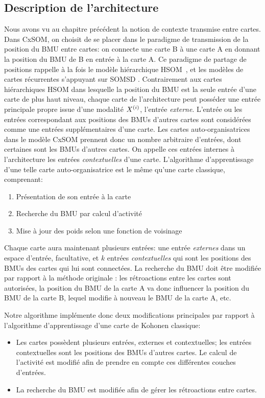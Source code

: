 \subsection{Description de l'architecture}

Nous avons vu au chapitre précédent la notion de contexte transmise entre cartes. Dans CxSOM, on choisit de se placer dans le paradigme de transmission de la position du BMU entre cartes: on connecte une carte B à une carte A en donnant la position du BMU de B en entrée à la carte A. 
Ce paradigme de partage de positions rappelle à la fois le modèle hiérarchique HSOM~\cite{lampinen_clustering_1992}, et les modèles de cartes récurrentes s'appuyant sur SOMSD \cite{hammer_recursive_2004,hagenbuchner_self-organizing_2003,fix20}.
Contrairement aux cartes hiérarchiques HSOM dans lesquelle la position du BMU est la seule entrée d'une carte de plus haut niveau, chaque carte de l'architecture peut posséder une entrée principale propre issue d'une modalité $X^{({i})}$, l'entrée \emph{externe}. L'entrée ou les entrées correspondant aux positions des BMUs d'autres cartes sont considérées comme une entrées supplémentaires d'une carte. Les cartes auto-organisatrices dans le modèle CxSOM prennent donc un nombre arbitraire d'entrées, dont certaines sont les BMUs d'autres cartes. On appelle ces entrées internes à l'architecture les entrées \emph{contextuelles} d'une carte.
L'algorithme d'apprentissage d'une telle carte auto-organisatrice est le même qu'une carte classique, comprenant:
\begin{enumerate}
\item\label{etape:entree} Présentation de son entrée à la carte 
\item\label{etape:bmu} Recherche du BMU par calcul d'activité
\item\label{etape:maj} Mise à jour des poids selon une fonction de voisinage
\end{enumerate}

Chaque carte aura maintenant plusieurs entrées: une entrée \emph{externes} dans un espace d'entrée, facultative, et $k$ entrées \emph{contextuelles} qui sont les positions des BMUs des cartes qui lui sont connectées. 
La recherche du BMU doit être modifiée par rapport à la méthode originale : les rétroactions entre les cartes sont autorisées, la position du BMU de la carte A va donc influencer la position du BMU de la carte B, lequel modifie à nouveau le BMU de la carte A, etc. 

Notre algorithme implémente donc deux modifications principales par rapport à l'algorithme d'apprentissage d'une carte de Kohonen classique: 
\begin{itemize}
\item Les cartes possèdent plusieurs entrées, externes et contextuelles; les entrées contextuelles sont les positions des BMUs d'autres cartes. Le calcul de l'activité est modifié afin de prendre en compte ces différentes couches d'entrées.
\item La recherche du BMU est modifiée afin de gérer les rétroactions entre cartes.
\end{itemize}

